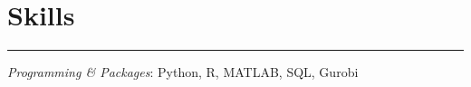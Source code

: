 \documentclass[12pt, a4paper]{article}
\begin{document}
{\begin{itemize}[leftmargin=26pt, itemsep=1pt, parsep=0.5pt, topsep=1pt]



\end{itemize}




\section*{Skills}
\vspace*{0.4em}
\hrule height 0.5pt

{\it Programming \& Packages}: Python, R, MATLAB, SQL, Gurobi

}



\end{document}
